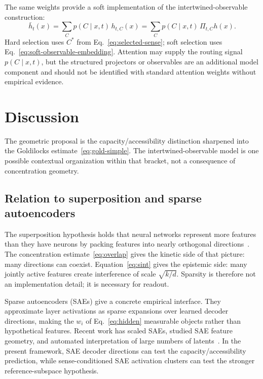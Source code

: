 \documentclass[
  aps,
  reprint,
  superscriptaddress,
  floatfix,
  nofootinbib,
  longbibliography
]{revtex4-2}
\begin{document}
The same weights provide a soft implementation of the intertwined-observable
construction:
%
\begin{equation}
\label{eq:soft-observable-embedding}
\bar h_t(x)
=\sum_C p(C\mid x,t)\,h_{t,C}(x)
=\sum_C p(C\mid x,t)\,\Pi_{t,C}h(x).
\end{equation}
%
Hard selection uses $C^*$ from Eq.~\eqref{eq:selected-sense}; soft selection
uses Eq.~\eqref{eq:soft-observable-embedding}.  Attention may supply the
routing signal $p(C\mid x,t)$, but the structured projectors or observables
are an additional model component and should not be identified with standard
attention weights without empirical evidence.

\section{Discussion}
\label{sec:discussion}

The geometric proposal is the capacity/accessibility distinction sharpened
into the Goldilocks estimate~\eqref{eq:gold-simple}.  The intertwined-observable
model is one possible contextual organization within that bracket, not a
consequence of concentration geometry.

\subsection{Relation to superposition and sparse autoencoders}
\label{sec:superposition}

The superposition hypothesis holds that neural networks represent more
features than they have neurons by packing features into nearly
orthogonal directions~\cite{elhage2022superposition,bricken2023monosemanticity}. The concentration
estimate~\eqref{eq:overlap} gives the kinetic side of that picture:
many directions can coexist. Equation~\eqref{eq:sint} gives the
epistemic side: many jointly active features create interference of
scale $\sqrt{k/d}$. Sparsity is therefore not an implementation
detail; it is necessary for readout.

Sparse autoencoders (SAEs) give a concrete empirical interface. They
approximate layer activations as sparse expansions over learned decoder
directions, making the $w_i$ of Eq.~\eqref{eq:hidden} measurable
objects rather than hypothetical features. Recent work has scaled SAEs,
studied SAE feature geometry, and automated interpretation of large
numbers of latents~\cite{gao2025scaling,li2025geometry,paulo2025automatically,shu2025survey}. In the
present framework, SAE decoder directions can test the
capacity/accessibility prediction, while sense-conditioned SAE
activation clusters can test the stronger reference-subspace hypothesis.
\end{document}
